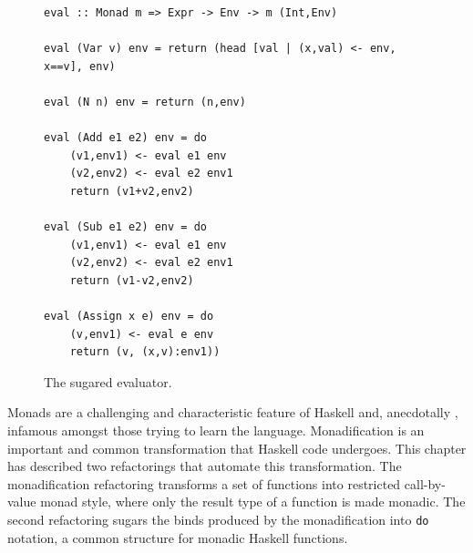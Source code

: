 \begin{figure}[t]
\begin{lstlisting}
eval :: Monad m => Expr -> Env -> m (Int,Env)

eval (Var v) env = return (head [val | (x,val) <- env, x==v], env)

eval (N n) env = return (n,env)

eval (Add e1 e2) env = do
	(v1,env1) <- eval e1 env
	(v2,env2) <- eval e2 env1
	return (v1+v2,env2)

eval (Sub e1 e2) env = do
	(v1,env1) <- eval e1 env 
	(v2,env2) <- eval e2 env1
	return (v1-v2,env2)

eval (Assign x e) env = do
	(v,env1) <- eval e env
	return (v, (x,v):env1))
\end{lstlisting}
\caption{The sugared evaluator.}
\label{finEval}
\end{figure}

\DIFaddbegin {}

\DIFaddend Monads are a challenging and characteristic feature of Haskell and, anecdotally \DIFaddbegin {}\DIFaddend , infamous amongst those trying to learn the language. Monadification is an important and common transformation that Haskell code undergoes. This chapter has described two refactorings that automate this transformation. The monadification refactoring transforms a set of functions into restricted call-by-value monad style, where only the result type of a function is made monadic. The second refactoring sugars the binds produced by the monadification into \texttt{do} notation, a common structure for monadic Haskell functions.

\chapter{\DIFdelbegin {}\DIFdelend \DIFaddbegin {}\DIFaddend }
\DIFdelbegin %
\DIFdelend \DIFaddbegin \label{chp:conc}
\DIFaddend 

